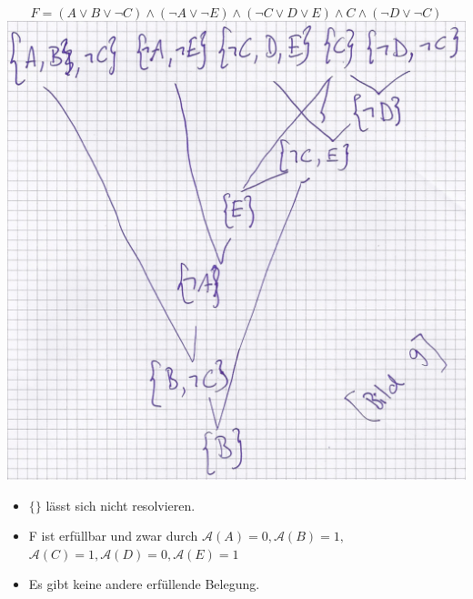 \begin{bsp*}
	$$F = ( A \vee B \vee \neg C ) \wedge ( \neg A \vee \neg E ) \wedge ( \neg C \vee D \vee E ) \wedge C \wedge ( \neg D \vee \neg C )$$
	\includegraphics[width=\textwidth]{Bild11}\\
	\begin{itemize}
		\item $\{\}$ lässt sich nicht resolvieren.
		\item F ist erfüllbar und zwar durch $\mathcal{A}( A ) = 0 , \mathcal{A}( B ) = 1 ,$ \\
			$\mathcal{A}( C ) = 1 , \mathcal{A}( D ) = 0 , \mathcal{A}( E ) = 1$
		\item Es gibt keine andere erfüllende Belegung.
	\end{itemize}
\end{bsp*}
